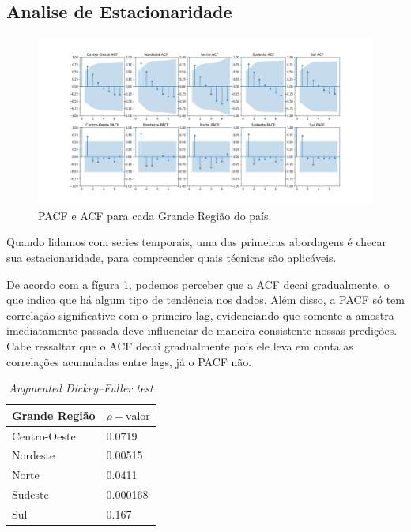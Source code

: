 \documentclass[12pt]{article}
\begin{document}
\subsection{Analise de Estacionaridade} 

\begin{figure}[!htbp]
    \begin{center}
    \includegraphics[width=\textwidth]{../figures/acf_pacf.png}
    \caption{\label{fig:corr} PACF e ACF para cada Grande Região do país.}
    \end{center}
\end{figure}

Quando lidamos com series temporais, uma das primeiras abordagens
é checar sua estacionaridade, para compreender quais técnicas são 
aplicáveis.

De acordo com a fígura \ref{fig:corr}, podemos perceber que a ACF 
decai gradualmente, o que indica que há algum tipo de tendência nos
dados. Além disso, a PACF só tem correlação significative com o primeiro lag,
evidenciando que somente a amostra imediatamente passada deve influenciar de
maneira consistente nossas predições. Cabe ressaltar que o ACF decai gradualmente
pois ele leva em conta as correlações acumuladas entre lags, já o PACF não. 

\begin{table}[h!]
\centering
\caption{\textit{Augmented Dickey–Fuller test}}
\label{tab:adf}
\begin{tabular}{ll}
\toprule
\textbf{Grande Região} & $\rho-\text{valor}$ \\
\midrule
Centro-Oeste  & 0.0719 \\
Nordeste  & 0.00515 \\
Norte  & 0.0411 \\
Sudeste & 0.000168 \\ 
Sul  & 0.167 \\
\bottomrule
\end{tabular}
\end{table}
\end{document}
